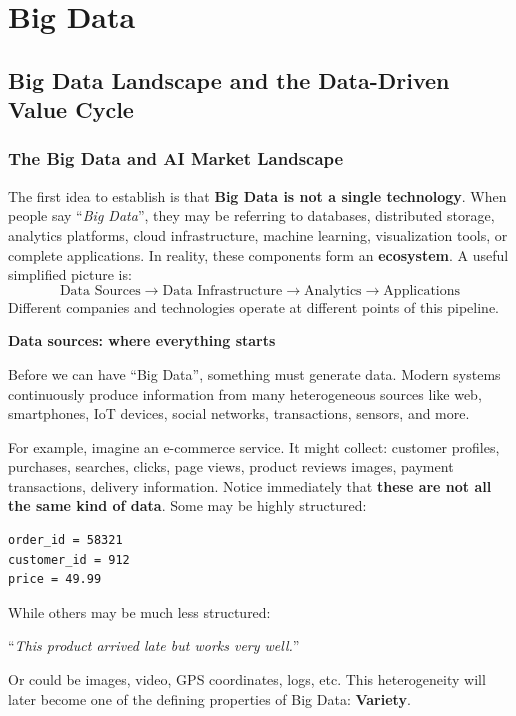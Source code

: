 \section{Big Data}\label{sec:big-data}

\subsection{Big Data Landscape and the Data-Driven Value Cycle}\label{subsec:big-data--big-data-landscape-and-the-data-driven-value-cycle}

\subsubsection{The Big Data and AI Market Landscape}\label{subsubsec:big-data--big-data--big-data-landscape-and-the-data-driven-value-cycle--the-big-data-and-ai-market-landscape}

The first idea to establish is that \textbf{Big Data is not a single technology}. When people say ``\emph{Big Data}'', they may be referring to databases, distributed storage, analytics platforms, cloud infrastructure, machine learning, visualization tools, or complete applications. In reality, these components form an \textbf{ecosystem}. A useful simplified picture is:
\begin{equation*}
    \text{Data Sources}
    \rightarrow
    \text{Data Infrastructure}
    \rightarrow
    \text{Analytics}
    \rightarrow
    \text{Applications}
\end{equation*}
Different companies and technologies operate at different points of this pipeline.

\highspace
\begin{flushleft}
    \textcolor{Green3}{ \textbf{Data sources: where everything starts}}
\end{flushleft}
Before we can have ``Big Data'', something must generate data. Modern systems continuously produce information from many heterogeneous sources like web, smartphones, IoT devices, social networks, transactions, sensors, and more.

\highspace
\begin{examplebox}
    For example, imagine an e-commerce service. It might collect: customer profiles, purchases, searches, clicks, page views, product reviews images, payment transactions, delivery information. Notice immediately that \textbf{these are not all the same kind of data}. Some may be highly structured:
\begin{lstlisting}
order_id = 58321
customer_id = 912
price = 49.99
\end{lstlisting}
    While others may be much less structured:
    \begin{center}
        ``\emph{This product arrived late but works very well.}''
    \end{center}
    Or could be images, video, GPS coordinates, logs, etc. This heterogeneity will later become one of the defining properties of Big Data: \textbf{Variety}.
\end{examplebox}


